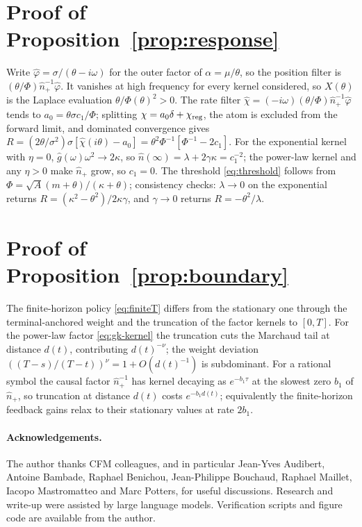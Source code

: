 \documentclass[11pt]{article}
\theoremstyle{plain}
\theoremstyle{definition}
\theoremstyle{remark}
\begin{document}
\section{Proof of Proposition~\ref{prop:response}}\label{app:C}
Write $\hat\varphi=\sigma/(\theta-i\omega)$ for the outer factor of $\alpha=\mu/\theta$, so the position filter is $(\theta/\Phi)\hat n_+^{-1}\hat\varphi$. It vanishes at high frequency for every kernel considered, so $X(\theta)$ is the Laplace evaluation $\theta/\Phi(\theta)^2>0$. The rate filter $\hat\chi=(-i\omega)(\theta/\Phi)\hat n_+^{-1}\hat\varphi$ tends to $a_0=\theta\sigma c_1/\Phi$; splitting $\chi=a_0\delta+\chi_{\rm reg}$, the atom is excluded from the forward limit, and dominated convergence gives $R=(2\theta/\sigma^2)\sigma[\hat\chi(i\theta)-a_0]=\theta^2\Phi^{-1}[\Phi^{-1}-2c_1]$. For the exponential kernel with $\eta=0$, $\hat g(\omega)\omega^2\to2\kappa$, so $\hat n(\infty)=\lambda+2\gamma\kappa=c_1^{-2}$; the power-law kernel and any $\eta>0$ make $\hat n_+$ grow, so $c_1=0$. The threshold \eqref{eq:threshold} follows from $\Phi=\sqrt A(m+\theta)/(\kappa+\theta)$; consistency checks: $\lambda\to0$ on the exponential returns $R=(\kappa^2-\theta^2)/2\kappa\gamma$, and $\gamma\to0$ returns $R=-\theta^2/\lambda$.

\section{Proof of Proposition~\ref{prop:boundary}}\label{app:D}
The finite-horizon policy \eqref{eq:finiteT} differs from the stationary one through the terminal-anchored weight and the truncation of the factor kernels to $[0,T]$. For the power-law factor \eqref{eq:gk-kernel} the truncation cuts the Marchaud tail at distance $d(t)$, contributing $d(t)^{-\nu}$; the weight deviation $((T-s)/(T-t))^\nu=1+O(d(t)^{-1})$ is subdominant. For a rational symbol the causal factor $\hat n_+^{-1}$ has kernel decaying as $e^{-b_1\tau}$ at the slowest zero $b_1$ of $\hat n_+$, so truncation at distance $d(t)$ costs $e^{-b_1 d(t)}$; equivalently the finite-horizon feedback gains relax to their stationary values at rate $2b_1$.

\paragraph{Acknowledgements.} The author thanks CFM colleagues, and in particular Jean-Yves Audibert, Antoine Bambade, Raphael Benichou, Jean-Philippe Bouchaud, Raphael Maillet, Iacopo Mastromatteo and Marc Potters, for useful discussions. Research and write-up were assisted by large language models. Verification scripts and figure code are available from the author.



\end{document}
